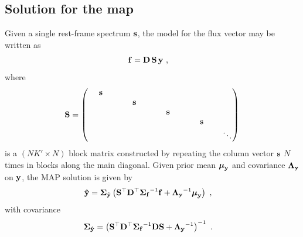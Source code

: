 \documentclass[modern]{aastex631}
\begin{document}
\subsection{Solution for the map}
\label{sec:solve_y}
%
Given a single rest-frame spectrum ${\mathbf{s}}$, the model for the flux vector may be written as
%
\begin{align}
    \label{eq:inverse:fy}
    {\ensuremath{\mathbf{f}}}
     & =
    {\mathbf{D}}
    \,
    {\mathbf{S}}
    \,
    {\mathbf{y}}
    \hskip 0.33em,
\end{align}
%
where
%
\begin{align}
    \label{eq:inverse:S}
    \bvec{S} =
    \begin{pmatrix}
        \quadquad\bvec{s}\quadquad &                            &                            &                            &        \\
                                   & \quadquad\bvec{s}\quadquad &                            &                            &        \\
                                   &                            & \quadquad\bvec{s}\quadquad &                            &        \\
                                   &                            &                            & \quadquad\bvec{s}\quadquad &        \\
                                   &                            &                            &                            & \ddots
    \end{pmatrix}
\end{align}
%
is a $(NK' \times N)$ block matrix constructed by repeating the column vector ${\mathbf{s}}$ $N$ times in blocks along the main diagonal.
%
Given prior mean $\boldsymbol{\mu}_{\mathbf{y}}$ and covariance $\boldsymbol{\Lambda}_{\mathbf{y}}$ on ${\mathbf{y}}$, the MAP solution is given by
%
\begin{align}
    \label{eq:inverse:y1hat}
    {\ensuremath{\mathbf{\hat{y}}}} & =
    \boldsymbol{\Sigma}_\mathbf{\hat{y}}
    \left(
    {\mathbf{S}}^\top{\ensuremath{\mathbf{D}}}^\top
    {\boldsymbol{\Sigma}_\mathbf{f}}^{-1}
    {\mathbf{f}}
    +
    {\boldsymbol{\Lambda}_{\mathbf{y}}}^{-1} \boldsymbol{\mu}_{\mathbf{y}}
    \right)
    \hskip 0.33em,
\end{align}
%
with covariance
%
\begin{align}
    \label{eq:inverse:y1cov}
    \boldsymbol{\Sigma}_{\mathbf{\hat{y}}} & =
    \left(
    {\mathbf{S}}^\top{\ensuremath{\mathbf{D}}}^\top
    {\boldsymbol{\Sigma}_{\ensuremath{\mathbf{f}}}}^{-1}
    {\mathbf{D}}{\mathbf{S}}
    +
    {\boldsymbol{\Lambda}_{\mathbf{y}}}^{-1}
    \right)^{-1}
    \hskip 0.33em.
\end{align}
\end{document}
